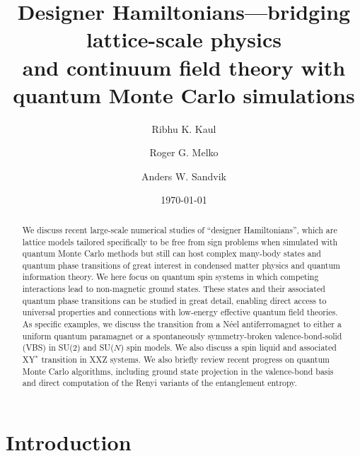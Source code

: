 \documentclass[aps,prb,groupedaddress,twocolumn]{revtex4}
\begin{document}
\title{Designer Hamiltonians---bridging lattice-scale physics \\ and continuum field theory with 
quantum Monte Carlo simulations} 

\author{Ribhu K. Kaul}
\author{Roger G. Melko}
\author{Anders W. Sandvik}


\date{\today}

\begin{abstract}
We discuss recent large-scale numerical studies of ``designer Hamiltonians'', which are lattice models tailored 
specifically to be free from sign problems when simulated with quantum Monte Carlo methods but still can host 
complex  many-body states and quantum phase transitions of great interest in condensed matter physics and quantum 
information theory. We here focus on quantum spin systems in which competing interactions lead to non-magnetic 
ground states. These states and their associated quantum phase transitions can be studied in great detail, 
enabling direct access to universal properties and connections with low-energy effective quantum field theories. 
As specific examples, we discuss the transition from a N\'eel antiferromagnet to either a uniform quantum paramagnet 
or a spontaneously symmetry-broken valence-bond-solid (VBS) in SU($2$) and SU($N$) spin models. We also discuss a
spin liquid and associated XY$^*$ transition in XXZ systems. We also briefly review recent progress on quantum Monte Carlo 
algorithms, including ground state projection in the valence-bond basis and direct computation of the Renyi variants 
of the entanglement entropy.
\end{abstract}

\pacs{}


\maketitle

\section{Introduction}
\end{document}

